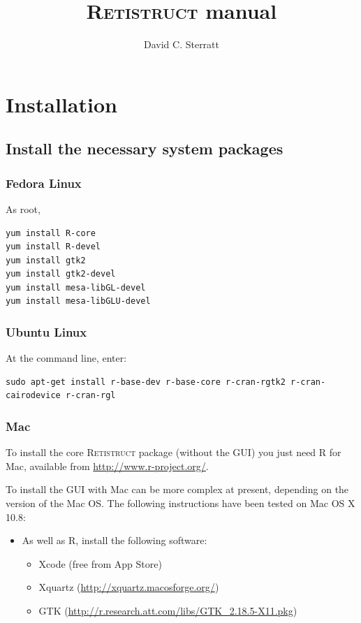 \documentclass{article}
\title{\textsc{Retistruct} manual}
\author{David C. Sterratt}
\begin{document}
\maketitle
\thispagestyle{myheadings}

\section{Installation}
\label{manual:sec:installation}

\subsection{Install the necessary system packages}

\subsubsection{Fedora Linux }

As root,

\begin{verbatim}
yum install R-core
yum install R-devel
yum install gtk2
yum install gtk2-devel
yum install mesa-libGL-devel
yum install mesa-libGLU-devel
\end{verbatim}

\subsubsection{Ubuntu Linux}
At the command line, enter:

\begin{verbatim}
sudo apt-get install r-base-dev r-base-core r-cran-rgtk2 r-cran-cairodevice r-cran-rgl
\end{verbatim}

\subsubsection{Mac}
\label{retistruct-manual:sec:mac}

To install the core \textsc{Retistruct} package (without the GUI) you
just need R for Mac, available from \href{http://www.r-project.org/}{http://www.r-project.org/}. 

To install the GUI with Mac can be more complex at present, depending
on the version of the Mac OS. The following instructions have been
tested on Mac OS X 10.8:
\begin{itemize}
\item As well as R, install the following software:
  \begin{itemize}
  \item Xcode (free from App Store)
  \item Xquartz (\href{http://xquartz.macosforge.org/}{http://xquartz.macosforge.org/})
  \item GTK (\href{http://r.research.att.com/libs/GTK_2.18.5-X11.pkg}{http://r.research.att.com/libs/GTK\_2.18.5-X11.pkg})
  \end{itemize}
\end{itemize}
\end{document}
